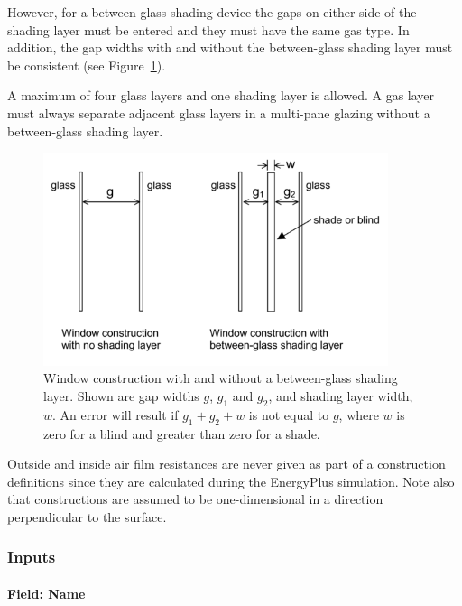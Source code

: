 However, for a between-glass shading device the gaps on either side of the shading layer must be entered and they must have the same gas type. In addition, the gap widths with and without the between-glass shading layer must be consistent (see Figure~\ref{fig:window-construction-with-and-without-a}).

A maximum of four glass layers and one shading layer is allowed. A gas layer must always separate adjacent glass layers in a multi-pane glazing without a between-glass shading layer.

\begin{figure}[hbtp] %
\centering
\includegraphics[width=0.9\textwidth, height=0.9\textheight, keepaspectratio=true]{media/image052.png}
  \caption{Window construction with and without a between-glass shading layer. Shown are gap widths \(g\), \(g_1\) and \(g_2\), and shading layer width, \(w\). An error will result if \(g_1 + g_2 +w\) is not equal to \(g\), where \(w\) is zero for a blind and greater than zero for a shade. \protect \label{fig:window-construction-with-and-without-a}}
\end{figure}

Outside and inside air film resistances are never given as part of a construction definitions since they are calculated during the EnergyPlus simulation. Note also that constructions are assumed to be one-dimensional in a direction perpendicular to the surface.

\subsubsection{Inputs}\label{inputs-34-000}

\paragraph{Field: Name}\label{field-name-28-001}

